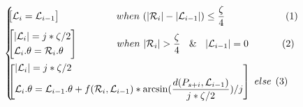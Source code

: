 \begin{small}
\vspace{-2ex}
\begin{equation*}
\label{equ-function}
\hspace{-1.5ex}\left\{
    \begin{aligned}
        &\hspace{-1.5ex}\left[
            \begin{aligned}
            & \mathcal{L}_{i} = \mathcal{L}_{i-1}\\
            \end{aligned}
        \right]\hspace{12.5ex}~when~(|\mathcal{R}_{i}| - |\mathcal{L}_{i-1}|) \le \frac{\zeta}{4} \hspace{14.5ex}(1)\\
        &\hspace{-1.5ex}\left[
            \begin{aligned}
            & |\mathcal{L}_{i}|  = j*{\zeta}/{2} \\
            & \mathcal{L}_{i}.\theta = \mathcal{R}_{i}.\theta    \\
            \end{aligned}
        \right]\hspace{8.5ex}~when~|\mathcal{R}_{i}| >  \frac{\zeta}{4}~\And~|\mathcal{L}_{i-1}|=0   \hspace{8ex}(2)~ \\
        &\hspace{-1.5ex}\left[
            \begin{aligned}
            & |\mathcal{L}_{i}|  = j*{\zeta}/{2}\\
            & \mathcal{L}_{i}.\theta = \mathcal{L}_{i-1}.\theta + f(\mathcal{R}_i,\mathcal{L}_{i-1})*\arcsin(\frac{d(P_{s+i}, \mathcal{L}_{i-1})}{j*\zeta/2})/j \\	
            \end{aligned}
        \right]\hspace{0ex}~else\hspace{1ex}(3)\\
    \end{aligned}
    \right.
\end{equation*}
\vspace{-2ex}
\end{small}


